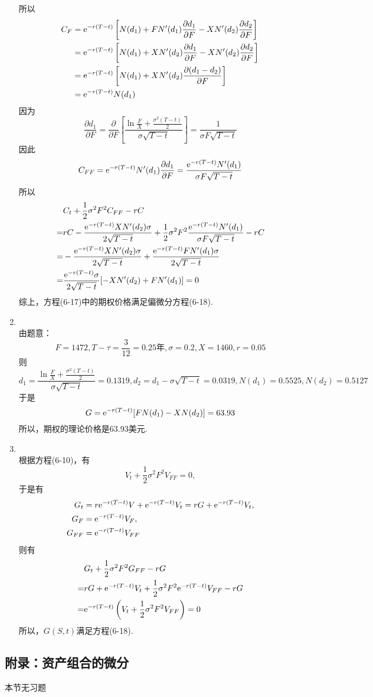 \begin{enumerate}
    所以
    \begin{align*}
        C_F & = \mathrm{e}^{-r(T-t)}\left[N(d_1)+FN'(d_1)\frac{\partial d_1}{\partial F}-XN'(d_2)\frac{\partial d_2}{\partial F}\right]\\
        & = \mathrm{e}^{-r(T-t)}\left[N(d_1)+XN'(d_2)\frac{\partial d_1}{\partial F}-XN'(d_2)\frac{\partial d_2}{\partial F}\right]\\
        & = \mathrm{e}^{-r(T-t)}\left[N(d_1)+XN'(d_2)\frac{\partial (d_1-d_2)}{\partial F}\right]\\
        & = \mathrm{e}^{-r(T-t)}N(d_1)
    \end{align*}
    因为\[\frac{\partial d_1}{\partial F}=\frac{\partial }{\partial F}\left[\frac{\ln\frac{F}{X}+\frac{\sigma^2(T-t)}{2}}{\sigma \sqrt{T-t}}\right] = \frac{1}{\sigma F \sqrt{T-t}}\]
    因此\[C_{FF} = \mathrm{e}^{-r(T-t)}N'(d_1)\frac{\partial d_1}{\partial F}=\frac{\mathrm{e}^{-r(T-t)}N'(d_1)}{\sigma F \sqrt{T-t}}\]
    所以
    \begin{align*}
        & C_t + \frac{1}{2}\sigma^2F^2C_{FF}-rC\\
        = & rC-\frac{\mathrm{e}^{-r(T-t)}XN'(d_2)\sigma}{2\sqrt{T-t}} + \frac{1}{2}\sigma^2F^2\frac{\mathrm{e}^{-r(T-t)}N'(d_1)}{\sigma F \sqrt{T-t}}-rC\\
        = & -\frac{\mathrm{e}^{-r(T-t)}XN'(d_2)\sigma}{2\sqrt{T-t}}+\frac{\mathrm{e}^{-r(T-t)}FN'(d_1)\sigma}{2\sqrt{T-t}}\\
        = & \frac{\mathrm{e}^{-r(T-t)}\sigma}{2\sqrt{T-t}}[-XN'(d_2)+FN'(d_1)]=0
    \end{align*}
    综上，方程(6-17)中的期权价格满足偏微分方程(6-18).
    \item \sol\\
    由题意：\[F=1472, T-\tau=\frac{3}{12}=0.25\text{年},\sigma=0.2,X=1460,r=0.05\]
    则\[d_1=\frac{\ln\frac{F}{X}+\frac{\sigma^2(T-t)}{2}}{\sigma\sqrt{T-t}}=0.1319,d_2=d_1-\sigma\sqrt{T-t}=0.0319,N(d_1)=0.5525,N(d_2)=0.5127\]
    于是\[G=\mathrm{e}^{-r(T-t)}[FN(d_1)-XN(d_2)]=63.93\]
    所以，期权的理论价格是63.93美元.
    \item \pro\\
    根据方程(6-10)，有\[V_t + \frac{1}{2}\sigma^2F^2V_{FF}=0,\]
    于是有
    \begin{align*}
        G_t & = r\mathrm{e}^{-r(T-t)}V+\mathrm{e}^{-r(T-t)}V_t=rG+\mathrm{e}^{-r(T-t)}V_t,\\
        G_F & = \mathrm{e}^{-r(T-t)}V_F,\\
        G_{FF} & = \mathrm{e}^{-r(T-t)}V_{FF}
    \end{align*}
    则有
    \begin{align*}
        & G_t + \frac{1}{2}\sigma^2F^2G_{FF}-rG\\
        = & rG+\mathrm{e}^{-r(T-t)}V_t + \frac{1}{2}\sigma^2F^2\mathrm{e}^{-r(T-t)}V_{FF}-rG\\
        = & \mathrm{e}^{-r(T-t)}\left(V_t + \frac{1}{2}\sigma^2F^2V_{FF}\right)=0
    \end{align*}
    所以，$G(S,t)$满足方程(6-18).
\end{enumerate}
\subsection{附录：资产组合的微分}
本节无习题
\clearpage
